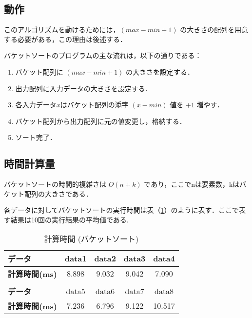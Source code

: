 \documentclass[a4j, titlepage]{jarticle}
\begin{document}
        \subsection{動作}
            このアルゴリズムを動けるためには，$(max - min + 1)$ の大きさの配列を用意する必要がある，この理由は後述する．
            
            バケットソートのプログラムの主な流れは，以下の通りである：
            \begin{screen}
                \begin{enumerate}
                    \item バケット配列に $(max - min + 1)$ の大きさを設定する．
                    \item 出力配列に入力データの大きさを設定する．
                    \item 各入力データ$x$はバケット配列の添字 $(x - min)$ 値を $+1$ 増やす．
                    \item バケット配列から出力配列に元の値変更し，格納する．
                    \item ソート完了．
                \end{enumerate}    
            \end{screen}

        \subsection{時間計算量}
            バケットソートの時間的複雑さは $O(n + k)$ であり，ここでnは要素数，kはバケット配列の大きさである．

            各データに対してバケットソートの実行時間は表（\ref{tab:bucket}）のように表す．ここで表す結果は10回の実行結果の平均値である.

            \begin{table}[tbh]
                \caption{計算時間 (バケットソート)}
                \label{tab:bucket}
                \begin{center}
                    \begin{tabular}{lcccc}
                        \hline
                        \textbf{データ} & data1 & data2 &data3 &data4\\ \hline
                        \textbf{計算時間(ms)} & 8.898 & 9.032 & 9.042 & 7.090 \\\hline
                        \\ \hline
                        \textbf{データ} &data5 &data6 &data7 &data8\\ \hline
                        \textbf{計算時間(ms)} & 7.236 & 6.796 & 9.122 & 10.517\\ \hline
                    \end{tabular}
                \end{center}
            \end{table}
\end{document}

